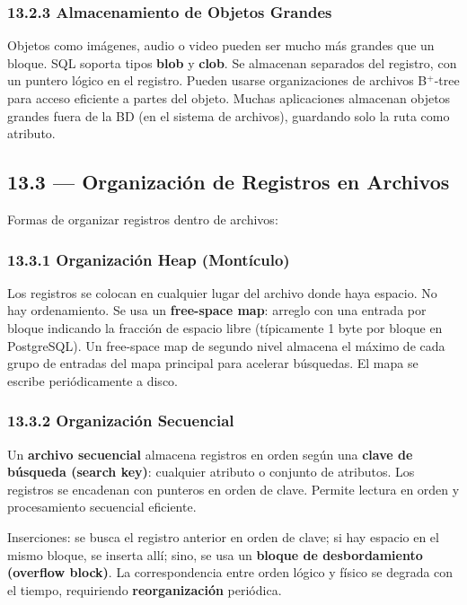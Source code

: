 \documentclass[11pt, a4paper]{article}
\begin{document}
\subsubsection{13.2.3 Almacenamiento de Objetos Grandes}

Objetos como imágenes, audio o video pueden ser mucho más grandes que un bloque. SQL soporta tipos \textbf{blob} y \textbf{clob}. Se almacenan separados del registro, con un puntero lógico en el registro. Pueden usarse organizaciones de archivos B$^+$-tree para acceso eficiente a partes del objeto. Muchas aplicaciones almacenan objetos grandes fuera de la BD (en el sistema de archivos), guardando solo la ruta como atributo.

\subsection{13.3 --- Organización de Registros en Archivos}

Formas de organizar registros dentro de archivos:

\subsubsection{13.3.1 Organización Heap (Montículo)}

Los registros se colocan en cualquier lugar del archivo donde haya espacio. No hay ordenamiento. Se usa un \textbf{free-space map}: arreglo con una entrada por bloque indicando la fracción de espacio libre (típicamente 1 byte por bloque en PostgreSQL). Un free-space map de segundo nivel almacena el máximo de cada grupo de entradas del mapa principal para acelerar búsquedas. El mapa se escribe periódicamente a disco.

\subsubsection{13.3.2 Organización Secuencial}

Un \textbf{archivo secuencial} almacena registros en orden según una \textbf{clave de búsqueda (search key)}: cualquier atributo o conjunto de atributos. Los registros se encadenan con punteros en orden de clave. Permite lectura en orden y procesamiento secuencial eficiente.

Inserciones: se busca el registro anterior en orden de clave; si hay espacio en el mismo bloque, se inserta allí; sino, se usa un \textbf{bloque de desbordamiento (overflow block)}. La correspondencia entre orden lógico y físico se degrada con el tiempo, requiriendo \textbf{reorganización} periódica.
\end{document}
